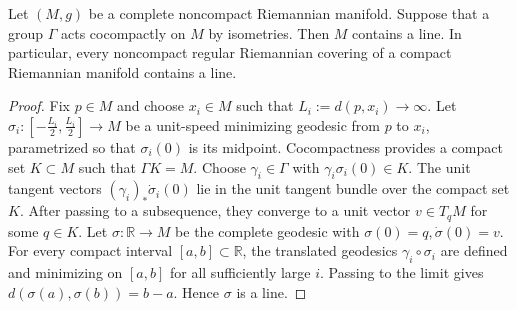 \documentclass[10pt,a4paper]{amsart}
\begin{document}
\begin{lemma}
\label{lem:cocompact-line}
Let $(M,g)$ be a complete noncompact Riemannian manifold. Suppose that a group $\Gamma$ acts cocompactly on $M$ by isometries. Then $M$ contains a line. In particular, every noncompact regular Riemannian covering of a compact Riemannian manifold contains a line.
\end{lemma}

\begin{proof}
Fix $p\in M$ and choose $x_i\in M$ such that
\(
    L_i:=d(p,x_i)\to\infty.
\)
Let
\(
    \sigma_i:
    [-\frac{L_i}{2},\frac{L_i}{2}]
    \to M
\)
be a unit-speed minimizing geodesic from $p$ to $x_i$, parametrized so that $\sigma_i(0)$ is its midpoint.
Cocompactness provides a compact set $K\subset M$ such that
\(
    \Gamma K=M.
\)
Choose $\gamma_i\in\Gamma$ with
\(
    \gamma_i\sigma_i(0)\in K.
\)
The unit tangent vectors
\(
    (\gamma_i)_*\dot{\sigma}_i(0)
\)
lie in the unit tangent bundle over the compact set $K$. After passing to a subsequence, they converge to a unit vector $v\in T_qM$ for some $q\in K$.
Let
\(
    \sigma:\mathbb{R}\to M
\)
be the complete geodesic with
\(
    \sigma(0)=q,
    \dot{\sigma}(0)=v.
\)
For every compact interval $[a,b]\subset\mathbb{R}$, the translated
geodesics $\gamma_i\circ\sigma_i$ are defined and minimizing on $[a,b]$ for all sufficiently large $i$. Passing to the limit gives
\(
    d(\sigma(a),\sigma(b))=b-a.
\)
Hence $\sigma$ is a line.
\end{proof}
\end{document}
